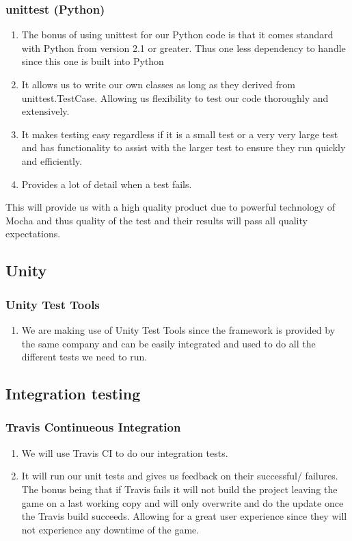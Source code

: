 \documentclass{article}
\begin{document}
		\subsubsection{unittest (Python)}
			\begin{enumerate}
				\item The bonus of using unittest for our Python code is that it comes standard with Python from version 2.1 or greater. Thus one less dependency to handle since this one is built into Python
				\item It allows us to write our own classes as long as they derived from unittest.TestCase. Allowing us flexibility to test our code thoroughly and extensively.
				\item It makes testing easy regardless if it is a small test or a very very large test and has functionality to assist with the larger test to ensure they run quickly and efficiently.
				\item Provides a lot of detail when a test fails.
			\end{enumerate}
			\noindent
			This will provide us with a high quality product due to powerful technology of Mocha and thus quality of the test and their results will pass all quality expectations.
	\subsection{Unity}
		\subsubsection{Unity Test Tools}
			\begin{enumerate}
				\item We are making use of Unity Test Tools since the framework is provided by the same company and can be easily integrated and used to do all the different tests we need to run.
			\end{enumerate}

	\subsection{Integration testing}
		\subsubsection{Travis Continueous Integration}
			\begin{enumerate}
				\item We will use Travis CI to do our integration tests.  
				\item It will run our unit tests and gives us feedback on their successful/ failures. The bonus being that if Travis fails it will not build the project leaving the game on a last working copy and will only overwrite and do the update once the Travis build succeeds. Allowing for a great user experience since they will not experience any downtime of the game. 
			\end{enumerate}
			
\end{document}
